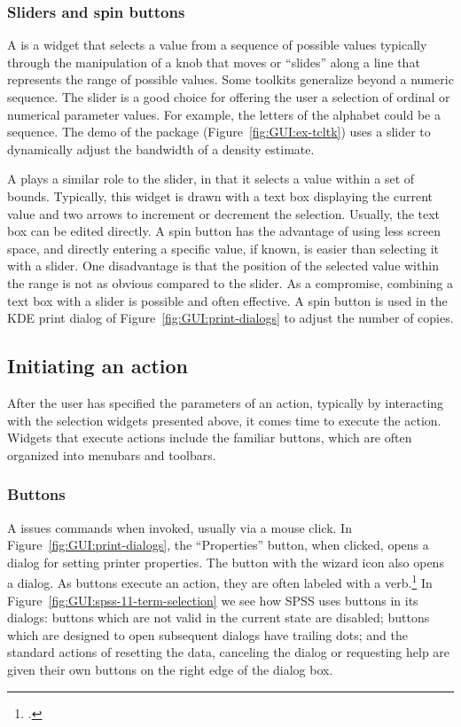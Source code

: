 \subsubsection{Sliders and spin buttons}
\label{sec:GUI:sliders}

A  is a widget that selects a value from a sequence of
possible values typically through the manipulation of a knob that
moves or ``slides'' along a line that represents the range of possible
values. 
Some toolkits generalize beyond a numeric
sequence. The slider is a good choice for offering the user a
selection of ordinal or numerical parameter values. For example, the
letters of the alphabet could be a sequence. The  demo
of the  package (Figure~\ref{fig:GUI:ex-tcltk}) uses a
slider to dynamically adjust the bandwidth of a density estimate.

A  plays a similar role to the slider, in that it
selects a value within a set of bounds. Typically, this widget is
drawn with a text box displaying the current value and two arrows to
increment or decrement the selection. Usually, the text box can be
edited directly.  A spin button has the advantage of using less screen
space, and directly entering a specific value, if known, is easier
than selecting it with a slider. One disadvantage is that the position
of the selected value within the range is not as obvious compared to
the slider. As a compromise, combining a text box with a slider is
possible and often effective. A spin button is used in the KDE print
dialog of Figure~\ref{fig:GUI:print-dialogs} to adjust the number of
copies.

\subsection{Initiating an action}

After the user has specified the parameters of an action, typically
by interacting with the selection widgets presented above, it comes time to
execute the action. Widgets that execute actions include the familiar
buttons, which are often organized into menubars and toolbars.

\subsubsection{Buttons}
\label{sec:GUI:buttons}

A  issues commands when invoked, usually via a mouse click.
In Figure~\ref{fig:GUI:print-dialogs}, the ``Properties'' button, when
clicked, opens a dialog for setting printer properties. The button
with the wizard icon also opens a dialog.  As buttons execute an
action, they are often labeled with a verb.\footcite{APPLE:HIG} In
Figure~\ref{fig:GUI:spss-11-term-selection} we see how SPSS uses
buttons in its dialogs: buttons which are not valid in the current
state are disabled; buttons which are designed to open subsequent
dialogs have trailing dots; and the standard actions of resetting the
data, canceling the dialog or requesting help are given their own
buttons on the right edge of the dialog box.

